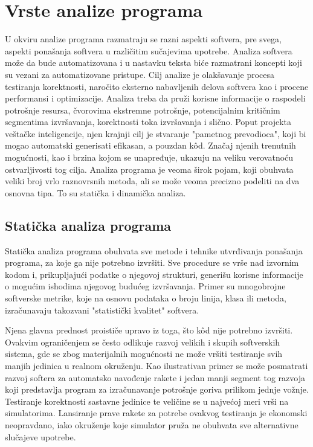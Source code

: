 \documentclass[12pt,oneside]{memoir}
\begin{document}
\section{Vrste analize programa}

U okviru analize programa razmatraju se razni aspekti softvera, pre svega, aspekti ponašanja softvera u različitim sučajevima upotrebe. Analiza softvera može da bude automatizovana i u nastavku teksta biće razmatrani koncepti koji su vezani za automatizovane pristupe. Cilj analize je olakšavanje procesa testiranja korektnosti, naročito eksterno nabavljenih delova softvera kao i procene performansi i optimizacije. Analiza treba da pruži korisne informacije o raspodeli potrošnje resursa, čvorovima ekstremne potrošnje, potencijalnim kritičnim segmentima izvršavanja, korektnosti toka izvršavanja i slično. Poput projekta veštačke inteligencije, njen krajnji cilj je stvaranje "pametnog prevodioca", koji bi mogao automatski generisati efikasan, a pouzdan k\^{o}d. Značaj njenih trenutnih mogućnosti, kao i brzina kojom se unapređuje, ukazuju na veliku verovatnoću ostvarljivosti tog cilja. Analiza programa je veoma širok pojam, koji obuhvata veliki broj vrlo raznovrsnih metoda, ali se može veoma precizno podeliti na dva osnovna tipa. To su statička i dinamička analiza.

\subsection{Statička analiza programa}

Statička analiza programa \cite{Static} obuhvata sve metode i tehnike utvrđivanja ponašanja programa, za koje ga nije potrebno izvršiti. Sve procedure se vrše nad izvornim kodom i, prikupljajući podatke o njegovoj strukturi, generišu korisne informacije o mogućim ishodima njegovog budućeg izvršavanja. Primer su mnogobrojne softverske metrike, koje na osnovu podataka o broju linija, klasa ili metoda, izračunavaju takozvani "statistički kvalitet" softvera. 

Njena glavna prednost proističe upravo iz toga, što k\^{o}d nije potrebno izvršiti. Ovakvim ograničenjem se često odlikuje razvoj velikih i skupih softverskih sistema, gde se zbog materijalnih mogućnosti ne može vršiti testiranje svih manjih jedinica u realnom okruženju. Kao ilustrativan primer se može posmatrati razvoj softera za automatsko navođenje rakete i jedan manji segment tog razvoja koji predstavlja program za izračunavanje potrošnje goriva prilikom jednje vožnje. Testiranje korektnosti sastavne jedinice te veličine se u najvećoj meri vrši na simulatorima. Lansiranje prave rakete za potrebe ovakvog testiranja je ekonomski neopravdano, iako okruženje koje simulator pruža ne obuhvata sve alternativne slučajeve upotrebe. 
\end{document}
